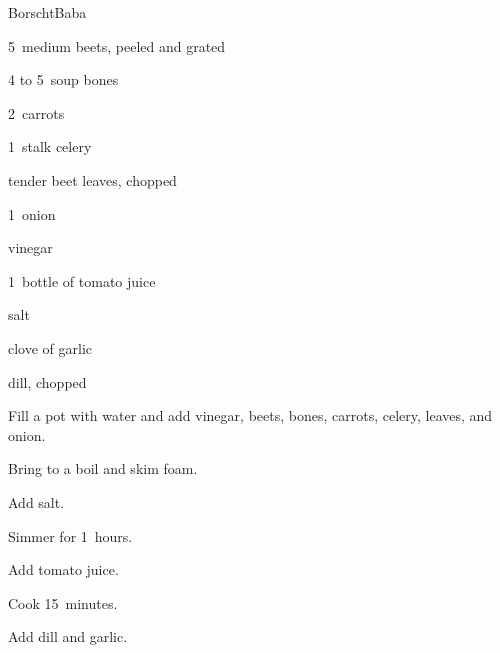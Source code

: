 \begin{recipe}{Borscht}{Baba}{}

\begin{ingredients}
\item 5~medium beets, peeled and grated
\item 4 to 5~soup bones
\item 2~carrots
\item 1~stalk celery
\item tender beet leaves, chopped
\item 1~onion
\item {} vinegar
\item 1~bottle of tomato juice
\item {} salt
\item clove of garlic
\item dill, chopped
\end{ingredients}

\begin{directions}
\item Fill a pot with water and add vinegar, beets, bones, carrots, celery, leaves, and onion.
\item Bring to a boil and skim foam.
\item Add salt.
\item Simmer for 1\half~hours.
\item Add tomato juice.
\item Cook 15~minutes.
\item Add dill and garlic.
\end{directions}

\end{recipe}
